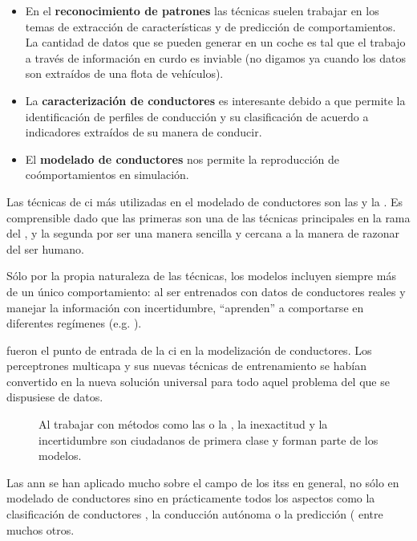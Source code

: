 \begin{itemize}
	\item En el \textbf{reconocimiento de patrones} las técnicas suelen trabajar en los temas de extracción de características y de predicción de comportamientos. La cantidad de datos que se pueden generar en un coche es tal que el trabajo a través de información en curdo es inviable (no digamos ya cuando los datos son extraídos de una flota de vehículos).
	\item La \textbf{caracterización de conductores} es interesante debido a que permite la identificación de perfiles de conducción y su clasificación de acuerdo a indicadores extraídos de su manera de conducir.
	\item El \textbf{modelado de conductores} nos permite la reproducción de coómportamientos en simulación.
\end{itemize}

Las técnicas de \gls{ci} más utilizadas en el modelado de conductores son las  y la . Es comprensible dado que las primeras son una de las técnicas principales en la rama del , y la segunda por ser una manera sencilla y cercana a la manera de razonar del ser humano.

Sólo por la propia naturaleza de las técnicas, los modelos incluyen siempre más de un único comportamiento: al ser entrenados con datos de conductores reales y manejar la información con incertidumbre, \enquote{aprenden} a comportarse en diferentes regímenes (e.g. \textit{}).

 fueron el punto de entrada de la \gls{ci} en la modelización de conductores. Los perceptrones multicapa y sus nuevas técnicas de entrenamiento se habían convertido en la nueva solución universal para todo aquel problema del que se dispusiese de datos.

\begin{figure}
	\caption[La inexactitud se tiene en cuenta en los modelos de la ]{Al trabajar con métodos como las  o la , la inexactitud y la incertidumbre son ciudadanos de primera clase y forman parte de los modelos.}
	\label{fig:ann-and-fl-work-with-uncertainty}
\end{figure}

Las \gls{ann} se han aplicado mucho sobre el campo de los \glspl{its} en general, no sólo en modelado de conductores sino en prácticamente todos los aspectos como la clasificación de conductores \cite{DiazAlvarez2014}, la conducción autónoma \cite{huval2015empirical} o la predicción (\cite{Dougherty1993, chan2012neural} entre muchos otros.

